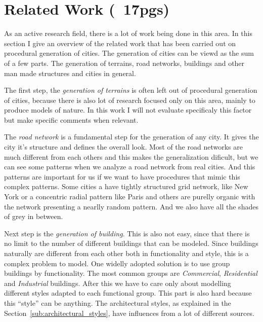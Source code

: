 
% 
% 


\section{Related Work (~17pgs)}
\label{sec:related_work}
%

As an active research field, there is a lot of work being done in this area. In this section I give an overview of the related work that has been carried out on procedural generation of cities. The generation of cities can be viewd as the sum of a few parts. The generation of terrains, road networks, buildings and other man made structures and cities in general.

The first step, the \emph{generation of terrains} is often left out of procedural generation of cities, because there is also lot of research focused only on this area, mainly to produce models of nature. In this work I will not evaluate specificaly this factor but make specific comments when relevant.

The \emph{road network} is a fundamental step for the generation of any city. It gives the city it's structure and defines the overall look. Most of the road networks are much different from each others and this makes the generalization dificult, but we can see some patterns when we analyze a road network from real cities. And this patterns are important for us if we want to have procedures that mimic this complex patterns. Some cities a have tightly structured grid network, like New York or a concentric radial pattern like Paris and others are purelly organic with the network presenting a nearlly random pattern. And we also have all the shades of grey in between.

Next step is the \emph{generation of building}. This is also not easy, since that there is no limit to the number of different buildings that can be modeled. Since buildings naturally are different from each other both in functionality and style, this is a complex problem to model. One widelly adopted solution is to use group buildings by functionality. The most common groups are \emph{Commercial}, \emph{Residential} and \emph{Industrial} buildings. After this we have to care only about modelling different styles adapted to each functional group. This part is also hard because this ``style'' can be anything. The architectural styles, as explained in the Section~\ref{sub:architectural_styles}, have influences from a lot of different sources. 

